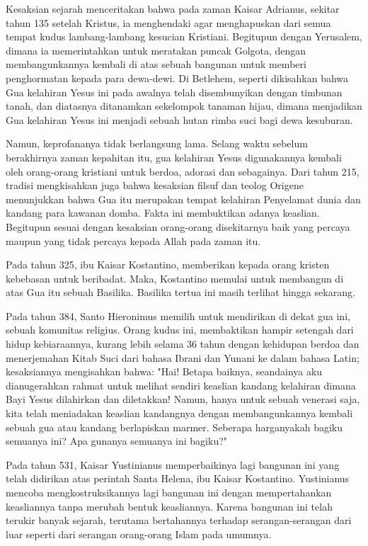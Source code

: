Kesaksian sejarah menceritakan bahwa pada zaman Kaisar Adrianus, sekitar tahun 135 setelah Kristus, ia menghendaki agar menghapuskan dari semua tempat kudus lambang-lambang kesucian Kristiani. Begitupun dengan Yerusalem, dimana ia memerintahkan untuk meratakan puncak Golgota, dengan membangunkannya kembali di atas sebuah bangunan untuk memberi penghormatan kepada para dewa-dewi. Di Betlehem, seperti dikisahkan bahwa Gua kelahiran Yesus ini pada awalnya telah disembunyikan dengan timbunan tanah, dan diatasnya ditanamkan sekelompok tanaman hijau, dimana menjadikan Gua kelahiran Yesus ini menjadi sebuah hutan rimba suci bagi dewa kesuburan.

Namun, keprofananya tidak berlangsung lama. Selang waktu sebelum berakhirnya zaman kepahitan itu, gua kelahiran Yesus digunakannya kembali oleh orang-orang kristiani untuk berdoa, adorasi dan sebagainya.
Dari tahun 215, tradisi mengkisahkan juga bahwa kesaksian filsuf dan teolog Origene menunjukkan bahwa Gua itu merupakan tempat kelahiran Penyelamat dunia dan kandang para kawanan domba. Fakta ini membuktikan adanya keaslian. Begitupun sesuai dengan kesaksian orang-orang disekitarnya baik yang percaya maupun yang tidak percaya kepada Allah pada zaman itu.

Pada tahun 325, ibu Kaisar Kostantino, memberikan kepada orang kristen kebebasan untuk beribadat. Maka, Kostantino memulai untuk membangun di atas Gua itu sebuah Basilika. Basilika tertua ini masih terlihat hingga sekarang.

Pada tahun 384, Santo Hieronimus memilih untuk mendirikan di dekat gua ini, sebuah komunitas religius. Orang kudus ini, membaktikan hampir setengah dari hidup kebiaraannya, kurang lebih selama 36 tahun dengan kehidupan berdoa dan menerjemahan Kitab Suci dari bahasa Ibrani dan Yunani ke dalam bahasa Latin; kesaksiannya mengisahkan bahwa: "Hai! Betapa baiknya, seandainya aku dianugerahkan rahmat untuk melihat sendiri keaslian kandang kelahiran dimana Bayi Yesus dilahirkan dan diletakkan! Namun, hanya untuk sebuah venerasi saja, kita telah meniadakan keaslian kandangnya dengan membangunkannya kembali sebuah gua atau kandang berlapiskan marmer. Seberapa harganyakah bagiku semuanya ini? Apa gunanya semuanya ini bagiku?"

Pada tahun 531, Kaisar Yustinianus memperbaikinya lagi bangunan ini yang telah didirikan atas perintah Santa Helena, ibu Kaisar Kostantino. Yustinianus mencoba mengkostruksikannya lagi bangunan ini dengan mempertahankan keasliannya tanpa merubah bentuk keasliannya. Karena bangunan ini telah terukir banyak sejarah, terutama bertahannya terhadap serangan-serangan dari luar seperti dari serangan orang-orang Islam pada umumnya.

